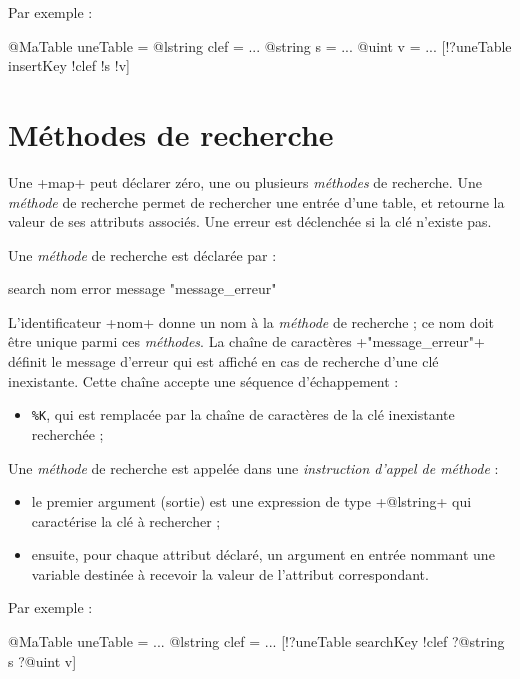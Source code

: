 Par exemple :
\begin{galgas}
@MaTable uneTable = {}
@lstring clef = ...
@string s = ...
@uint v = ...
[!?uneTable insertKey !clef !s !v]
\end{galgas}











\section{Méthodes de recherche}

Une \ggs+map+ peut déclarer zéro, une ou plusieurs \emph{méthodes} de recherche. Une \emph{méthode} de recherche permet de rechercher une entrée d'une table, et retourne la valeur de ses attributs associés. Une erreur est déclenchée si la clé n'existe pas.


Une \emph{méthode} de recherche est déclarée par :


\begin{galgas}
search nom error message "message_erreur"
\end{galgas}

L'identificateur \ggs+nom+ donne un nom à la \emph{méthode} de recherche ; ce nom doit être unique parmi ces \emph{méthodes}. La chaîne de caractères \ggs+"message_erreur"+ définit le message d'erreur qui est affiché en cas de recherche d'une clé inexistante. Cette chaîne accepte une séquence d'échappement :
\begin{itemize}
  \item \texttt{\%K}, qui est remplacée par la chaîne de caractères de la clé inexistante recherchée ;
\end{itemize}


Une \emph{méthode} de recherche est appelée dans une \emph{instruction d'appel de méthode} :
\begin{itemize}
  \item le premier argument (sortie) est une expression de type \ggs+@lstring+ qui caractérise la clé à rechercher ;
  \item ensuite, pour chaque attribut déclaré, un argument en entrée nommant une variable destinée à recevoir la valeur de l'attribut correspondant.
\end{itemize}

Par exemple :
\begin{galgas}
@MaTable uneTable = {}
...
@lstring clef = ...
[!?uneTable searchKey !clef ?@string s ?@uint v]
\end{galgas}













